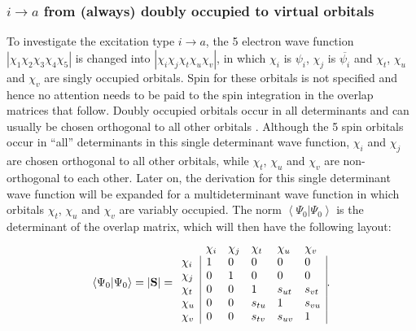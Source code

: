 \subsubsection{\label{ch2.sec.i-a}$i \rightarrow a$ from (always) doubly occupied to virtual orbitals}

To investigate the excitation type $i \rightarrow a$, the 5 electron wave function $|\chi_1\chi_2\chi_3\chi_4\chi_5|$ is changed into $|\chi_i\chi_j\chi_t\chi_u\chi_v|$, in which $\chi_i$ is $\psi_i$, $\chi_j$ is $\overline{\psi_i}$ and $\chi_t$, $\chi_u$ and $\chi_v$ are singly occupied orbitals. Spin for these orbitals is not specified and hence no attention needs to be paid to the spin integration in the overlap matrices that follow. Doubly occupied orbitals occur in all determinants and can usually be chosen orthogonal to all other orbitals \cite{koos1}. Although the 5 spin orbitals occur in ``all'' determinants in this single determinant wave function, $\chi_i$ and $\chi_j$ are chosen orthogonal to all other orbitals, while $\chi_t$, $\chi_u$ and $\chi_v$ are non-orthogonal to each other. Later on, the derivation for this single determinant wave function will be expanded for a multideterminant wave function in which orbitals $\chi_t$, $\chi_u$ and $\chi_v$ are variably occupied. The norm $\left < \Psi_0 | \Psi_0 \right>$ is the determinant of the overlap matrix, which will then have the following layout:
\begin{equation}
\left < \Psi_0 | \Psi_0 \right> = | \mathbf{S} | =
\begin{array}{llllll}
 &  \chi_i & \chi_j & \chi_t & \chi_u & \chi_v \\
 \chi_i & \multicolumn{1}{|l}{ 1 } & 0 & 0 & 0 & \multicolumn{1}{l|}{ 0 } \\
 \chi_j & \multicolumn{1}{|l}{ 0 } & 1 & 0 & 0 & \multicolumn{1}{l|}{ 0 } \\
 \chi_t & \multicolumn{1}{|l}{ 0 } & 0 & 1 & s_{ut} & \multicolumn{1}{l|}{s_{vt}} \\
 \chi_u & \multicolumn{1}{|l}{ 0 } & 0 & s_{tu} & 1 & \multicolumn{1}{l|}{s_{vu}} \\
 \chi_v & \multicolumn{1}{|l}{ 0 } & 0 & s_{tv} & s_{uv} & \multicolumn{1}{l|}{1}
\end{array}.
\label{ch2.eq.s0}
\end{equation}

